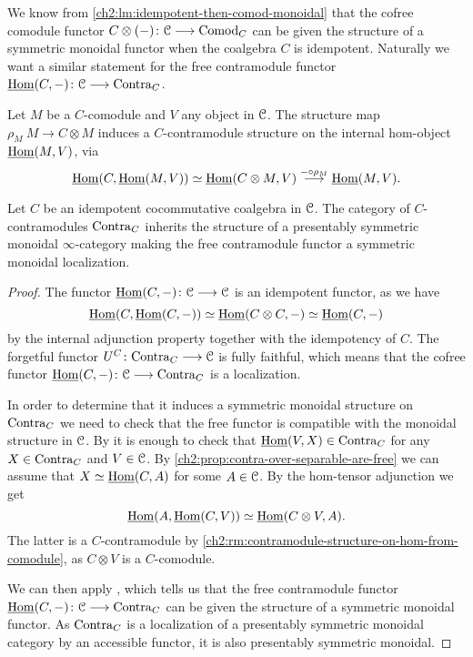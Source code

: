We know from \cref{ch2:lm:idempotent-then-comod-monoidal} that the cofree comodule functor $C\otimes(-)\colon \EuScript{C}\longrightarrow \mathrm{Comod}_C$ can be given the structure of a symmetric monoidal functor when the coalgebra $C$ is idempotent. Naturally we want a similar statement for the free contramodule functor $\operatorname{\underline{Hom}}(C,-)\colon \EuScript{C}\longrightarrow \mathrm{Contra}_C$. 

\begin{remark}
    \label{ch2:rm:contramodule-structure-on-hom-from-comodule}
    Let $M$ be a $C$-comodule and $V$ any object in $\EuScript{C}$. The structure map $\rho_M\: M\to C\otimes M$ induces a $C$-contramodule structure on the internal hom-object $\operatorname{\underline{Hom}}(M, V)$, via 
    \[\operatorname{\underline{Hom}}(C, \operatorname{\underline{Hom}}(M, V))\simeq \operatorname{\underline{Hom}}(C\otimes M, V)\overset{-\circ \rho_M}{\longrightarrow} \operatorname{\underline{Hom}}(M, V).\]
\end{remark}

\begin{lemma}
    \label{ch2:lm:free-contra-monoidal}
    Let $C$ be an idempotent cocommutative coalgebra in $\EuScript{C}$. The category of $C$-contramodules $\mathrm{Contra}_C$ inherits the structure of a presentably symmetric monoidal $\infty$-category making the free contramodule functor a symmetric monoidal localization.
\end{lemma}
\begin{proof}
    The functor $\operatorname{\underline{Hom}}(C,-)\colon \EuScript{C} \longrightarrow \EuScript{C}$ is an idempotent functor, as we have
    \[\operatorname{\underline{Hom}}(C, \operatorname{\underline{Hom}}(C,-))\simeq \operatorname{\underline{Hom}}(C\otimes C, -)\simeq \operatorname{\underline{Hom}}(C,-)\]
    by the internal adjunction property together with the idempotency of $C$. The forgetful functor $U^C\colon \mathrm{Contra}_C\longrightarrow \EuScript{C}$ is fully faithful, which means that the cofree functor $\operatorname{\underline{Hom}}(C,-)\colon\EuScript{C}\longrightarrow \mathrm{Contra}_C$ is a localization. 
    
    In order to determine that it induces a symmetric monoidal structure on $\mathrm{Contra}_C$ we need to check that the free functor is compatible with the monoidal structure in $\EuScript{C}$. By \cite[2.12(3)]{nikolaus_2016} it is enough to check that $\operatorname{\underline{Hom}}(V,X)\in \mathrm{Contra}_C$ for any $X\in \mathrm{Contra}_C$ and $V\in \EuScript{C}$. By \cref{ch2:prop:contra-over-separable-are-free} we can assume that $X \simeq \operatorname{\underline{Hom}}(C, A)$ for some $A\in \EuScript{C}$. By the hom-tensor adjunction we get 
    \[\operatorname{\underline{Hom}}(A, \operatorname{\underline{Hom}}(C, V))\simeq \operatorname{\underline{Hom}}(C\otimes V, A).\]
    The latter is a $C$-contramodule by \cref{ch2:rm:contramodule-structure-on-hom-from-comodule}, as $C\otimes V$ is a $C$-comodule. 

    We can then apply \cite[2.2.1.9]{lurie_09}, which tells us that the free contramodule functor $\operatorname{\underline{Hom}}(C,-)\colon \EuScript{C}\longrightarrow \mathrm{Contra}_C$ can be given the structure of a symmetric monoidal functor. As $\mathrm{Contra}_C$ is a localization of a presentably symmetric monoidal category by an accessible functor, it is also presentably symmetric monoidal.  
\end{proof}



